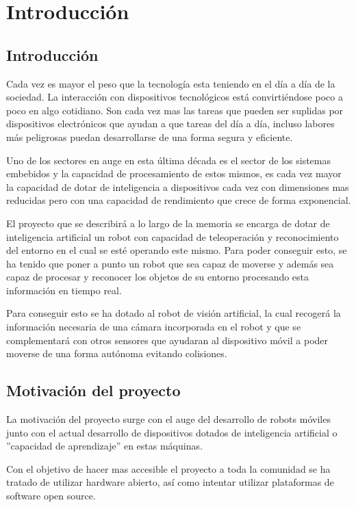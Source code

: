 \chapter{Introducción}\label{cap:introduccion}
\section{Introducción} 
Cada vez es mayor el peso que la tecnología esta teniendo en el día a día de la sociedad. La interacción con dispositivos tecnológicos está convirtiéndose poco a poco en algo cotidiano. Son cada vez mas las tareas que pueden ser suplidas por dispositivos electrónicos que ayudan a que tareas del día a día, incluso labores más peligrosas puedan desarrollarse de una forma segura y eficiente.

Uno de los sectores en auge en esta última década es el sector de los sistemas embebidos y la capacidad de procesamiento de estos mismos, es cada vez mayor la capacidad de dotar de inteligencia a dispositivos cada vez con dimensiones mas reducidas pero con una capacidad de rendimiento que crece de forma exponencial.

El proyecto que se describirá a lo largo de la memoria se encarga de dotar de inteligencia artificial un robot con capacidad de teleoperación y reconocimiento del entorno en el cual se esté operando este mismo. Para poder conseguir esto, se ha tenido que poner a punto un robot que sea capaz de moverse y además sea capaz de procesar y reconocer los objetos de su entorno procesando esta información en tiempo real.

Para conseguir esto se ha dotado al robot de visión artificial, la cual recogerá la información necesaria de una cámara incorporada en el robot y que se complementará con otros sensores que ayudaran al dispositivo móvil a poder moverse de una forma autónoma evitando colisiones.


\section{Motivación del proyecto} 
La motivación del proyecto surge con el auge del desarrollo de robots móviles junto con el actual desarrollo de dispositivos dotados de inteligencia artificial o ''capacidad de aprendizaje'' en estas máquinas. 

Con el objetivo de hacer mas accesible el proyecto a toda la comunidad se ha tratado de utilizar hardware abierto, así como intentar utilizar plataformas de software open source.

